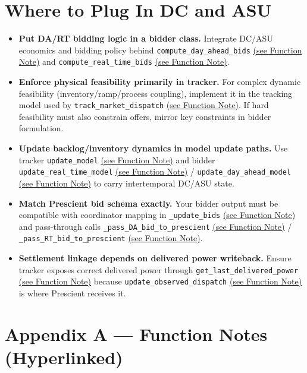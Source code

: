 \documentclass{article}
\begin{document}
\section{Where to Plug In DC and ASU}
\begin{itemize}[leftmargin=*]
  \item \textbf{Put DA/RT bidding logic in a bidder class.} Integrate DC/ASU economics and bidding policy behind \texttt{compute\_day\_ahead\_bids} \hyperref[fn:compute_day_ahead_bids]{(see Function Note)} and \texttt{compute\_real\_time\_bids} \hyperref[fn:compute_real_time_bids]{(see Function Note)}.

  \item \textbf{Enforce physical feasibility primarily in tracker.} For complex dynamic feasibility (inventory/ramp/process coupling), implement it in the tracking model used by \texttt{track\_market\_dispatch} \hyperref[fn:track_market_dispatch]{(see Function Note)}. If hard feasibility must also constrain offers, mirror key constraints in bidder formulation.

  \item \textbf{Update backlog/inventory dynamics in model update paths.} Use tracker \texttt{update\_model} \hyperref[fn:tracker_update_model]{(see Function Note)} and bidder \texttt{update\_real\_time\_model} \hyperref[fn:update_real_time_model]{(see Function Note)} / \texttt{update\_day\_ahead\_model} \hyperref[fn:update_day_ahead_model]{(see Function Note)} to carry intertemporal DC/ASU state.

  \item \textbf{Match Prescient bid schema exactly.} Your bidder output must be compatible with coordinator mapping in \texttt{\_update\_bids} \hyperref[fn:update_bids]{(see Function Note)} and pass-through calls \texttt{\_pass\_DA\_bid\_to\_prescient} \hyperref[fn:pass_DA_bid_to_prescient]{(see Function Note)} / \texttt{\_pass\_RT\_bid\_to\_prescient} \hyperref[fn:pass_RT_bid_to_prescient]{(see Function Note)}.

  \item \textbf{Settlement linkage depends on delivered power writeback.} Ensure tracker exposes correct delivered power through \texttt{get\_last\_delivered\_power} \hyperref[fn:get_last_delivered_power]{(see Function Note)} because \texttt{update\_observed\_dispatch} \hyperref[fn:update_observed_dispatch]{(see Function Note)} is where Prescient receives it.
\end{itemize}

\appendix
\section{Appendix A --- Function Notes (Hyperlinked)}
\end{document}
